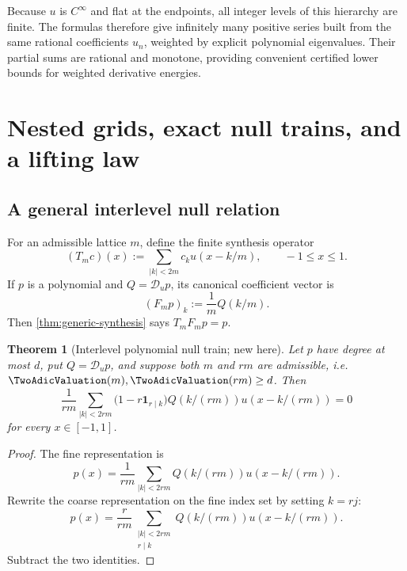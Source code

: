 \documentclass[11pt,oneside]{article}
\numberwithin{equation}{section}
\newtheorem{theorem}{Theorem}[section]
\theoremstyle{definition}
\theoremstyle{remark}
\newcommand{\Dscr}{\mathscr D_u}
\newcommand{\one}{\mathbf 1}
\begin{document}
Because $u$ is $C^\infty$ and flat at the endpoints, all integer levels of
this hierarchy are finite.  The formulas therefore give infinitely many
positive series built from the same rational coefficients $u_n$, weighted by
explicit polynomial eigenvalues.  Their partial sums are rational and
monotone, providing convenient certified lower bounds for weighted derivative
energies.

\section{Nested grids, exact null trains, and a lifting law}
\label{sec:nested}

\subsection{A general interlevel null relation}

For an admissible lattice $m$, define the finite synthesis operator
\begin{equation}
 (T_mc)(x):=\sum_{|k|<2m}c_k u(x-k/m),
 \qquad -1\le x\le1.
 \label{eq:Tm}
\end{equation}
If $p$ is a polynomial and $Q=\Dscr p$, its canonical coefficient vector is
\begin{equation}
 (F_mp)_k:=\frac1mQ(k/m).
 \label{eq:Fm}
\end{equation}
Then \cref{thm:generic-synthesis} says $T_mF_mp=p$.

\begin{theorem}[Interlevel polynomial null train; new here]
\label{thm:interlevel-null}
Let $p$ have degree at most $d$, put $Q=\Dscr p$, and suppose both $m$ and
$rm$ are admissible, i.e. $\TwoAdicValuation(m),\TwoAdicValuation(rm)\ge d$.  Then
\begin{equation}
 \boxed{
 \frac1{rm}\sum_{|k|<2rm}
 \bigl(1-r\one_{r\mid k}\bigr)
 Q(k/(rm))u(x-k/(rm))=0}
 \label{eq:interlevel-null}
\end{equation}
for every $x\in[-1,1]$.
\end{theorem}

\begin{proof}
The fine representation is
\[
 p(x)=\frac1{rm}\sum_{|k|<2rm}Q(k/(rm))u(x-k/(rm)).
\]
Rewrite the coarse representation on the fine index set by setting $k=rj$:
\[
 p(x)=\frac r{rm}\sum_{\substack{|k|<2rm\\r\mid k}}
 Q(k/(rm))u(x-k/(rm)).
\]
Subtract the two identities.
\end{proof}
\end{document}
